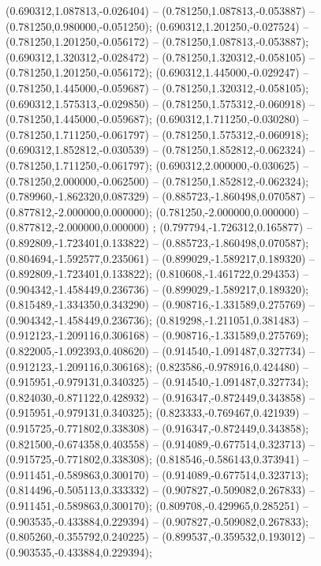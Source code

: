 (0.690312,1.087813,-0.026404) -- (0.781250,1.087813,-0.053887) -- (0.781250,0.980000,-0.051250);
 (0.690312,1.201250,-0.027524) -- (0.781250,1.201250,-0.056172) -- (0.781250,1.087813,-0.053887);
 (0.690312,1.320312,-0.028472) -- (0.781250,1.320312,-0.058105) -- (0.781250,1.201250,-0.056172);
 (0.690312,1.445000,-0.029247) -- (0.781250,1.445000,-0.059687) -- (0.781250,1.320312,-0.058105);
 (0.690312,1.575313,-0.029850) -- (0.781250,1.575312,-0.060918) -- (0.781250,1.445000,-0.059687);
 (0.690312,1.711250,-0.030280) -- (0.781250,1.711250,-0.061797) -- (0.781250,1.575312,-0.060918);
 (0.690312,1.852812,-0.030539) -- (0.781250,1.852812,-0.062324) -- (0.781250,1.711250,-0.061797);
 (0.690312,2.000000,-0.030625) -- (0.781250,2.000000,-0.062500) -- (0.781250,1.852812,-0.062324);
 (0.789960,-1.862320,0.087329) -- (0.885723,-1.860498,0.070587) -- (0.877812,-2.000000,0.000000);
 (0.781250,-2.000000,0.000000) -- (0.877812,-2.000000,0.000000) ;
 (0.797794,-1.726312,0.165877) -- (0.892809,-1.723401,0.133822) -- (0.885723,-1.860498,0.070587);
 (0.804694,-1.592577,0.235061) -- (0.899029,-1.589217,0.189320) -- (0.892809,-1.723401,0.133822);
 (0.810608,-1.461722,0.294353) -- (0.904342,-1.458449,0.236736) -- (0.899029,-1.589217,0.189320);
 (0.815489,-1.334350,0.343290) -- (0.908716,-1.331589,0.275769) -- (0.904342,-1.458449,0.236736);
 (0.819298,-1.211051,0.381483) -- (0.912123,-1.209116,0.306168) -- (0.908716,-1.331589,0.275769);
 (0.822005,-1.092393,0.408620) -- (0.914540,-1.091487,0.327734) -- (0.912123,-1.209116,0.306168);
 (0.823586,-0.978916,0.424480) -- (0.915951,-0.979131,0.340325) -- (0.914540,-1.091487,0.327734);
 (0.824030,-0.871122,0.428932) -- (0.916347,-0.872449,0.343858) -- (0.915951,-0.979131,0.340325);
 (0.823333,-0.769467,0.421939) -- (0.915725,-0.771802,0.338308) -- (0.916347,-0.872449,0.343858);
 (0.821500,-0.674358,0.403558) -- (0.914089,-0.677514,0.323713) -- (0.915725,-0.771802,0.338308);
 (0.818546,-0.586143,0.373941) -- (0.911451,-0.589863,0.300170) -- (0.914089,-0.677514,0.323713);
 (0.814496,-0.505113,0.333332) -- (0.907827,-0.509082,0.267833) -- (0.911451,-0.589863,0.300170);
 (0.809708,-0.429965,0.285251) -- (0.903535,-0.433884,0.229394) -- (0.907827,-0.509082,0.267833);
 (0.805260,-0.355792,0.240225) -- (0.899537,-0.359532,0.193012) -- (0.903535,-0.433884,0.229394);
